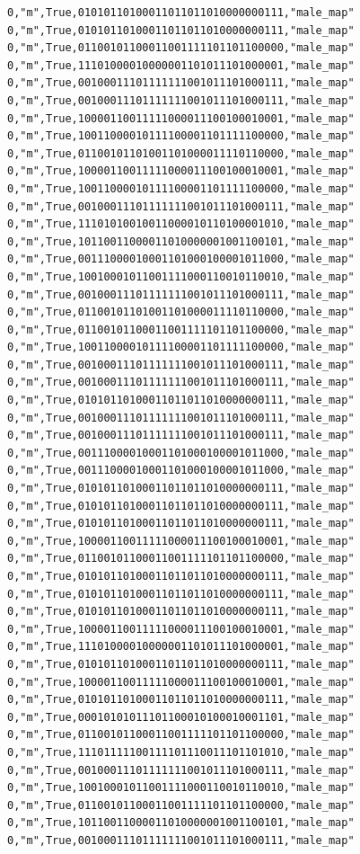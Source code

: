 \documentclass[authoryearcitations]{UoYCSproject}
\begin{document}
\begin{framed}
\begin{verbatim}
0,"m",True,01010110100011011011010000000111,"male_map"
0,"m",True,01010110100011011011010000000111,"male_map"
0,"m",True,01100101100011001111101101100000,"male_map"
0,"m",True,11101000010000001101011101000001,"male_map"
0,"m",True,00100011101111111001011101000111,"male_map"
0,"m",True,00100011101111111001011101000111,"male_map"
0,"m",True,10000110011111000011100100010001,"male_map"
0,"m",True,10011000010111100001101111100000,"male_map"
0,"m",True,01100101101001101000011110110000,"male_map"
0,"m",True,10000110011111000011100100010001,"male_map"
0,"m",True,10011000010111100001101111100000,"male_map"
0,"m",True,00100011101111111001011101000111,"male_map"
0,"m",True,11101010010011000010110100001010,"male_map"
0,"m",True,10110011000011010000001001100101,"male_map"
0,"m",True,00111000010001101000100001011000,"male_map"
0,"m",True,10010001011001111000110010110010,"male_map"
0,"m",True,00100011101111111001011101000111,"male_map"
0,"m",True,01100101101001101000011110110000,"male_map"
0,"m",True,01100101100011001111101101100000,"male_map"
0,"m",True,10011000010111100001101111100000,"male_map"
0,"m",True,00100011101111111001011101000111,"male_map"
0,"m",True,00100011101111111001011101000111,"male_map"
0,"m",True,01010110100011011011010000000111,"male_map"
0,"m",True,00100011101111111001011101000111,"male_map"
0,"m",True,00100011101111111001011101000111,"male_map"
0,"m",True,00111000010001101000100001011000,"male_map"
0,"m",True,00111000010001101000100001011000,"male_map"
0,"m",True,01010110100011011011010000000111,"male_map"
0,"m",True,01010110100011011011010000000111,"male_map"
0,"m",True,01010110100011011011010000000111,"male_map"
0,"m",True,10000110011111000011100100010001,"male_map"
0,"m",True,01100101100011001111101101100000,"male_map"
0,"m",True,01010110100011011011010000000111,"male_map"
0,"m",True,01010110100011011011010000000111,"male_map"
0,"m",True,01010110100011011011010000000111,"male_map"
0,"m",True,10000110011111000011100100010001,"male_map"
0,"m",True,11101000010000001101011101000001,"male_map"
0,"m",True,01010110100011011011010000000111,"male_map"
0,"m",True,10000110011111000011100100010001,"male_map"
0,"m",True,01010110100011011011010000000111,"male_map"
0,"m",True,00010101011101100010100010001101,"male_map"
0,"m",True,01100101100011001111101101100000,"male_map"
0,"m",True,11101111100111101110011101101010,"male_map"
0,"m",True,00100011101111111001011101000111,"male_map"
0,"m",True,10010001011001111000110010110010,"male_map"
0,"m",True,01100101100011001111101101100000,"male_map"
0,"m",True,10110011000011010000001001100101,"male_map"
0,"m",True,00100011101111111001011101000111,"male_map"

\end{verbatim}
\end{framed}
\end{document}
